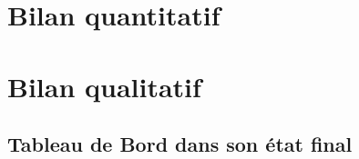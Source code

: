 

\newcommand{\mainTitle}{\'Etude préalable - SPIE}
\newcommand{\secondTitle}{Bilan du projet}
\newcommand{\documentRef}{RDB/4401/1}
\newcommand{\auteurs}{
Lisa \textsc{Courant} \\
Estelle \textsc{Lepeigneux} \\
Pierre \textsc{Jarsaillon} \\
Hugues \textsc{Verlin} \\
}
\newcommand{\chefDeProjet}{Paul \textsc{Dautry}}
\newcommand{\responsableQualite}{Antoine \textsc{Chabert}}




\newpage

\tableofcontents
\listoffigures
\listoftables
\newpage

\part{Bilan quantitatif}
\setcounter{section}{0}


\part{Bilan qualitatif}
\setcounter{section}{0}


\appendix

\chapter{Tableau de Bord dans son état final}





